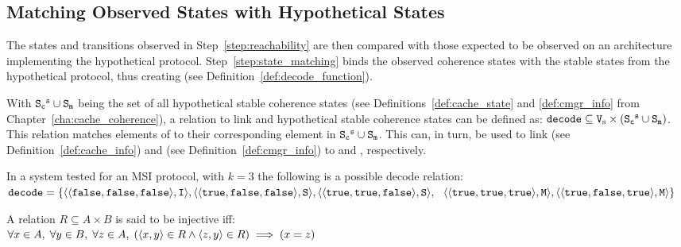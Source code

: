 \subsection{Matching Observed States with Hypothetical States}
The states and transitions observed in Step~\ref{step:reachability} are then
compared with those expected to be observed on an architecture implementing the
hypothetical protocol. Step~\ref{step:state_matching} binds the observed
coherence states with the stable states from the hypothetical protocol, thus
creating \decodefun{} (see
Definition~\ref{def:decode_function}).

\begin{definition}
\label{def:decode_function}
   With $\text{\texttt{S\textsubscript{c}\textsuperscript{s}}}{} \cup \text{\texttt{S\textsubscript{m}}}{}$ being the set of all
   hypothetical stable coherence states (see Definitions~\ref{def:cache_state}
   and \ref{def:cmgr_info} from Chapter~\ref{cha:cache_coherence}), a relation
   to link \validarchboolflags{} and hypothetical stable coherence states can
   be defined as:
   $\text{\texttt{decode}}{} \subseteq \text{\texttt{V}\textsubscript{s}}{} \times (\text{\texttt{S\textsubscript{c}\textsuperscript{s}}}{}
   \cup \text{\texttt{S\textsubscript{m}}}{})$. This relation matches elements of
   \validarchboolflags{} to their corresponding element in $\text{\texttt{S\textsubscript{c}\textsuperscript{s}}}{}
   \cup \text{\texttt{S\textsubscript{m}}}{}$. This can, in turn, be used to link
   \cachestatefun{} (see Definition~\ref{def:cache_info}) and
   \coherencemanagerstatefun{} (see Definition~\ref{def:cmgr_info}) to
   \cacheboolstatefun{} and \coherencemanagerboolstatefun{}, respectively.
\end{definition}
\begin{example}
In a system tested for an MSI protocol, with $k=3$ the following is a possible
decode relation:\\$\text{\texttt{decode}}{} =
\{\langle \langle \texttt{false}, \texttt{false}, \texttt{false}\rangle, \texttt{I}\rangle, \langle\langle \texttt{true},
\texttt{false}, \texttt{false}\rangle, \texttt{S}\rangle, \langle\langle \texttt{true},
\texttt{true}, \texttt{false}\rangle, \texttt{S}\rangle,\\~~
\langle\langle \texttt{true}, \texttt{true}, \texttt{true}\rangle, \texttt{M}\rangle,\langle\langle \texttt{true}, \texttt{false}, \texttt{true}\rangle,
\texttt{M}\rangle\}$
\end{example}

\begin{definition}
\label{def:injective_relation}
A relation $R \subseteq A \times B$ is said to be injective iff:\\
$
\forallin{x}{A}{%
   \forallin{y}{B}{%
      \forallin{z}{A}{%
         (\langle x, y \rangle \in R
         \land
         \langle z, y \rangle \in R)
         \implies
         (x = z)
      }%
   }%
}%
$
\end{definition}

